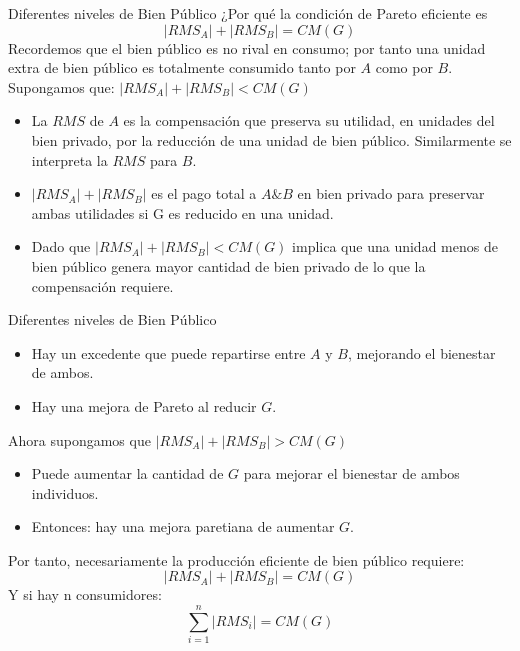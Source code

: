 \begin{frame}{Diferentes niveles de Bien Público}
	¿Por qué la condición de Pareto eficiente es
		$$\left| RMS_A\right| + \left| RMS_B\right| = CM(G)$$
	Recordemos que el bien público es no rival en consumo; por tanto una unidad extra de bien público es totalmente consumido tanto por $A$ como por $B$.\\
	
	Supongamos que: $\left| RMS_A\right| + \left| RMS_B\right| < CM(G)$
		\begin{itemize}
			\item La $RMS$ de $A$ es la compensación que preserva su utilidad, en unidades del bien privado, por la reducción de una unidad de bien público. Similarmente se interpreta la $RMS$ para $B$.
			\item $\left| RMS_A\right| + \left| RMS_B\right|$ es el pago total a  $A \& B$ en bien privado para preservar ambas utilidades si  G es reducido en una unidad.
			\item Dado que $\left| RMS_A\right| + \left| RMS_B\right| < CM(G)$ implica que una unidad menos de bien público genera mayor cantidad de bien privado de lo que la compensación requiere.
		\end{itemize}
\end{frame}
\begin{frame}{Diferentes niveles de Bien Público}
		\begin{itemize}
			\item Hay un excedente que puede repartirse entre $A$ y $B$, mejorando el bienestar de ambos.
			\item Hay una mejora de Pareto al reducir $G$.
		\end{itemize}
	Ahora supongamos que $\left| RMS_A\right| + \left| RMS_B\right| > CM(G)$
		\begin{itemize}
			\item Puede aumentar la cantidad de $G$ para  mejorar el bienestar de ambos individuos.
			\item Entonces: hay una mejora paretiana de aumentar $G$.
		\end{itemize}
	Por tanto, necesariamente la producción eficiente de bien público requiere:
		$$\left| RMS_A\right| + \left| RMS_B\right| = CM(G)$$
	Y si hay n consumidores:
		$$\sum_{i=1}^{n}\left| RMS_i\right| = CM(G)$$
\end{frame}
